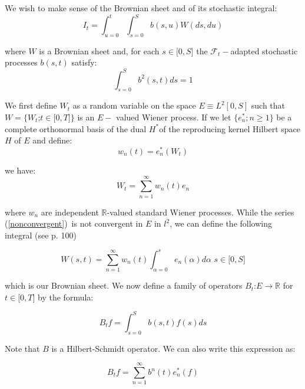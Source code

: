 \documentclass{article}
\begin{document}
\bigskip

We wish to make sense of the Brownian sheet and of its stochastic integral:%
\begin{equation}
I_{t}=\int_{u=0}^{t}\int_{s=0}^{S}b(s,u)W(ds,du)  \label{continuous}
\end{equation}%
\bigskip

where $W$ is a Brownian sheet and, for each $s\in \lbrack 0,S]$ the $%
\mathcal{F}_{t}-$adapted stochastic processes $b(s,t)$ satisfy:%
\begin{equation*}
\int_{s=0}^{S}b^{2}(s,t)ds=1
\end{equation*}

We first define $W_{t}$ as a random variable on the space $E\equiv L^{2}[0,S]
$ such that $W=\{W_{t}$;$t\in \lbrack 0,T]\}$ is an $E-$ valued Wiener
process. If we let $\{e_{n}^{\ast };n\geq 1\}$ be a complete orthonormal
basis of the dual $H^{\ast }$of the reproducing kernel Hilbert space $H$ of $%
E$ and define:%
\begin{equation*}
w_{n}(t)=e_{n}^{\ast }(W_{t})
\end{equation*}

we have:%
\begin{equation}
W_{t}=\sum_{n=1}^{\infty }w_{n}(t)e_{n}  \label{nonconvergent}
\end{equation}

where $w_{n}$ are independent $\mathbb{R}$-valued standard Wiener processes.
While the series (\ref{nonconvergent})\ is not convergent in $E$ in $l^{2}$,
we can define the following integral (see \cite{DPZ92} p. 100)

\begin{equation*}
W(s,t)=\sum_{n=1}^{\infty }w_{n}(t)\int_{\alpha=0}^{s}e_{n}(\alpha )d\alpha \text{
\ \ }s\in \lbrack 0,S]
\end{equation*}

which is our Brownian sheet. We now define a family of operators $B_{t}$:$%
E\rightarrow \mathbb{R}$ for $t\in \lbrack 0,T]$ by the formula:

\begin{equation*}
B_{t}f=\int_{s=0}^{S}b(s,t)f(s)ds
\end{equation*}

Note that $B$ is a Hilbert-Schmidt operator. We can also write this
expression as:

\begin{equation*}
B_{t}f=\sum_{n=1}^{\infty }b^{n}(t)e_{n}^{\ast }(f)
\end{equation*}
\end{document}
